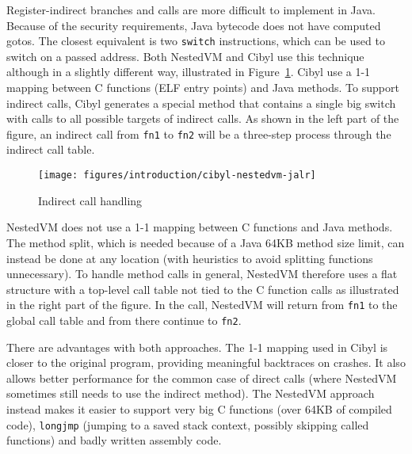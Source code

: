 Register-indirect branches and calls are more difficult to implement in Java.
Because of the security requirements, Java bytecode does not have computed
gotos. The closest equivalent is two \texttt{switch} instructions, which can
be used to switch on a passed address. Both NestedVM and Cibyl use this
technique although in a slightly different way, illustrated in
Figure~\ref{fig:introduction:cibyl-nestedvm-jalr}. Cibyl use a 1-1 mapping
between C functions (ELF entry points) and Java methods. To support indirect
calls, Cibyl generates a special method that contains a single big switch with
calls to all possible targets of indirect calls. As shown in the left part of
the figure, an indirect call from \texttt{fn1} to \texttt{fn2} will be a
three-step process through the indirect call table.

\begin{figure}[t]
  \begin{center}
    \texttt{[image: figures/introduction/cibyl-nestedvm-jalr]}
  \end{center}
  \caption{Indirect call handling}
  \label{fig:introduction:cibyl-nestedvm-jalr}
\end{figure}

NestedVM does not use a 1-1 mapping between C functions and Java methods.  The
method split, which is needed because of a Java 64KB method size limit, can
instead be done at any location (with heuristics to avoid splitting functions
unnecessary). To handle method calls in general, NestedVM therefore uses a flat
structure with a top-level call table not tied to the C function calls as
illustrated in the right part of the figure. In the call, NestedVM will return
from \texttt{fn1} to the global call table and from there continue to
\texttt{fn2}.

There are advantages with both approaches. The 1-1 mapping used in Cibyl is
closer to the original program, providing meaningful backtraces on crashes. It
also allows better performance for the common case of direct calls (where
NestedVM sometimes still needs to use the indirect method). The NestedVM
approach instead makes it easier to support very big C functions (over 64KB of
compiled code), \texttt{longjmp} (jumping to a saved stack context, possibly
skipping called functions) and badly written assembly code.

